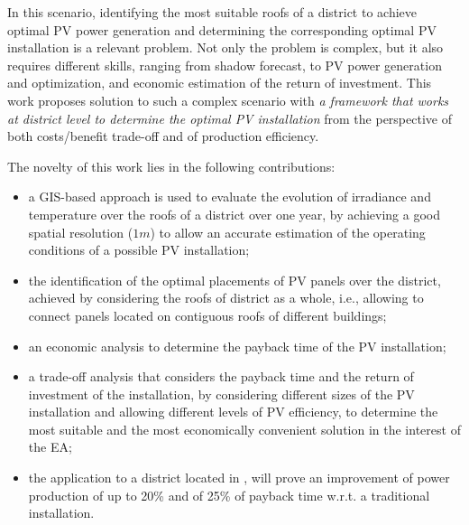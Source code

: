 In this scenario, identifying the most suitable roofs of a district to achieve optimal PV power generation and determining the corresponding optimal PV installation is a relevant problem. Not only the problem is complex, but it also requires different skills, ranging from shadow forecast, to PV power generation and optimization, and economic estimation of the return of investment. 
This work proposes solution to such a complex scenario with \emph{a framework that works at district level to determine the optimal PV installation} from the perspective of both costs/benefit trade-off and of production efficiency.  

The novelty of this work lies in the following contributions: 
\begin{itemize}
    \item a GIS-based approach is used to evaluate the evolution of irradiance and temperature over the roofs of a district over one year, by achieving a good spatial resolution ($1m$) to allow an accurate estimation of the operating conditions of a possible PV installation;
    \item the identification of the optimal placements of PV panels over the district, achieved by considering the roofs of district as a whole, i.e., allowing to connect panels located on contiguous roofs of different buildings; 
    \item an economic analysis to determine the payback time of the PV installation; 
    \item a trade-off analysis that considers the payback time and the return of investment of the installation, by considering different sizes of the PV installation and allowing different levels of PV efficiency, to determine the most suitable and the most economically convenient solution in the interest of the EA; 
    \item the application to a district located in , will prove an improvement of power production of up to 20\% and of 25\% of payback time w.r.t. a traditional installation. 
\end{itemize}

